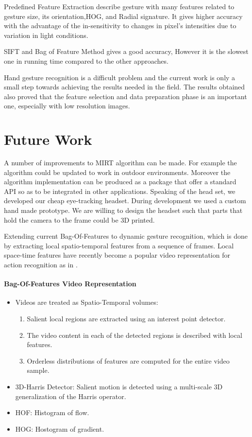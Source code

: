 Predefined Feature Extraction describe gesture with many features related to gesture size, its orientation,HOG, and Radial signature. It gives higher accuracy with the advantage of the in-sensitivity to changes in pixel's intensities due to variation in light conditions.
\bigskip

SIFT and Bag of Feature Method gives a good accuracy, However it is the slowest one in running time compared to the other approaches.
\bigskip

Hand gesture recognition is a difficult problem and the current work is only a small step towards achieving the results needed in the field.
The results obtained also proved that the feature selection and data preparation phase is an important one, especially with low resolution
images. \bigskip


\section{Future Work} 
A number of improvements to MIRT algorithm can be made. For example the algorithm could be updated to work in outdoor environments. Moreover the algorithm implementation can be produced as a package that offer a standard API so as to be integrated in other applications. Speaking of the head set, we developed our cheap eye-tracking headset. During development we used a custom hand made prototype. We are willing to design the headset such that parts that hold the camera to the frame could be 3D printed. \bigskip

Extending current Bag-Of-Features to dynamic gesture recognition, which is done by extracting local spatio-temporal features from a sequence of frames. Local space-time features have recently become a popular video representation for action recognition as in \cite{future}.

\paragraph{Bag-Of-Features Video Representation}
\begin{itemize}
\item Videos are treated as Spatio-Temporal volumes:
\begin{enumerate}
\item Salient local regions are extracted using an interest point detector.
\item The video content in each of the detected regions is described with local features.
\item Orderless distributions of features are computed for the entire video sample.
\end{enumerate}
 \bigskip
\item 3D-Harris Detector: Salient motion is detected using a multi-scale 3D generalization of the Harris operator.
\item HOF: Histogram of flow.
\item HOG: Hostogram of gradient.
\end{itemize}
\bigskip

